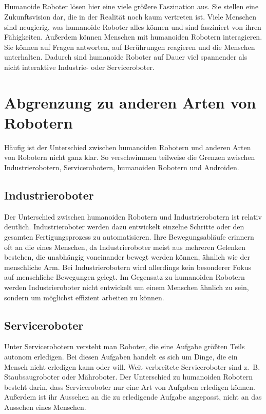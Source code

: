 \subparagraph{}
Humanoide Roboter lösen hier eine viele größere Faszination aus. Sie
stellen eine Zukunftsvision dar, die in der Realität noch kaum vertreten ist.
Viele Menschen sind neugierig, was humanoide Roboter alles können und sind
fasziniert von ihren Fähigkeiten. Außerdem können Menschen mit humanoiden
Robotern interagieren. Sie können auf Fragen antworten, auf Berührungen
reagieren und die Menschen unterhalten. Dadurch sind humanoide Roboter auf
Dauer viel spannender als nicht interaktive Industrie- oder Serviceroboter.
\cite{Dautenhahn2011}

\section{Abgrenzung zu anderen Arten von Robotern}\label{sec:abgrenzung}
Häufig ist der Unterschied zwischen humanoiden Robotern und anderen Arten von
Robotern nicht ganz klar. So verschwimmen teilweise die Grenzen zwischen
Industrierobotern, Servicerobotern, humanoiden Robotern und Androiden.

\subsection{Industrieroboter}\label{sec:industrieroboter}
Der Unterschied zwischen humanoiden Robotern und Industrierobotern ist relativ
deutlich. Industrieroboter werden dazu entwickelt einzelne Schritte oder den
gesamten Fertigungsprozess zu automatisieren. Ihre Bewegungsabläufe erinnern oft
an die eines Menschen, da Industrieroboter meist aus mehreren Gelenken bestehen,
die unabhängig voneinander bewegt werden können, ähnlich wie der menschliche
Arm. \cite{Weber2017} Bei Industrierobotern wird allerdings kein besonderer
Fokus auf menschliche Bewegungen gelegt. Im Gegensatz zu humanoiden Robotern
werden Industrieroboter nicht entwickelt um einem Menschen ähnlich zu sein,
sondern um möglichst effizient arbeiten zu können.

\subsection{Serviceroboter}\label{sec:serviceroboter}
Unter Servicerobotern versteht man Roboter, die eine Aufgabe größten Teils
autonom erledigen. Bei diesen Aufgaben handelt es sich um Dinge, die ein Mensch
nicht erledigen kann oder will. Weit verbreitete Serviceroboter sind z.~B.
Staubsaugroboter oder Mähroboter. Der Unterschied zu humanoiden Robotern besteht
darin, dass Serviceroboter nur eine Art von Aufgaben erledigen können.
Außerdem ist ihr Aussehen an die zu erledigende Aufgabe angepasst, nicht an das
Aussehen eines Menschen.

